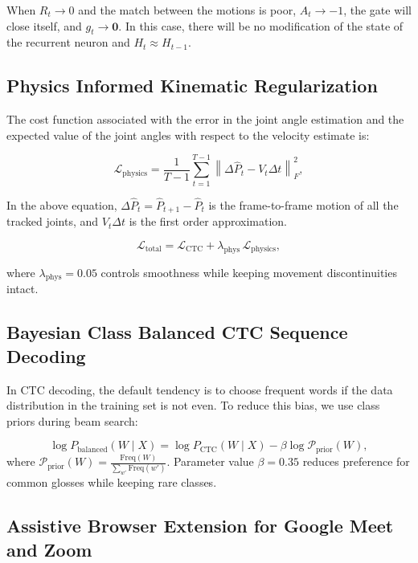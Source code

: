 \documentclass[conference]{IEEEtran}
\begin{document}
When $R_t \to 0$ and the match between the motions is poor, $A_t \to -1$, the gate will close itself, and $g_t \to \mathbf{0}$. In this case, there will be no modification of the state of the recurrent neuron and $H_t \approx H_{t-1}$.

\subsection{Physics Informed Kinematic Regularization}

The cost function associated with the error in the joint angle estimation and the expected value of the joint angles with respect to the velocity estimate is:

\begin{equation}
\mathcal{L}_{\text{physics}} = \frac{1}{T-1} \sum_{t=1}^{T-1} \left\| \Delta \hat{P}_t - V_t \Delta t \right\|_F^2,
\end{equation}

In the above equation, $\Delta \hat{P}_t = \hat{P}_{t+1} - \hat{P}_t$ is the frame-to-frame motion of all the tracked joints, and $V_t \Delta t$ is the first order approximation. 


\begin{equation}
\mathcal{L}_{\text{total}} = \mathcal{L}_{\text{CTC}} + \lambda_{\text{phys}} \, \mathcal{L}_{\text{physics}},
\end{equation}

where $\lambda_\text{phys} = 0.05$ controls smoothness while keeping movement discontinuities intact.

\subsection{Bayesian Class Balanced CTC Sequence Decoding}

In CTC decoding, the default tendency is to choose frequent words if the data distribution in the training set is not even. To reduce this bias, we use class priors during beam search:

\begin{equation}
\log P_{\text{balanced}}(W \mid X) = \log P_{\text{CTC}}(W \mid X) - \beta \log \mathcal{P}_{\text{prior}}(W),
\label{eq:bayesian_math}
\end{equation}
where $\mathcal{P}_{\text{prior}}(W) = \frac{\text{Freq}(W)}{\sum_{w'} \text{Freq}(w')}$. Parameter value $\beta = 0.35$ reduces preference for common glosses while keeping rare classes.

\subsection{Assistive Browser Extension for Google Meet and Zoom}
\end{document}
